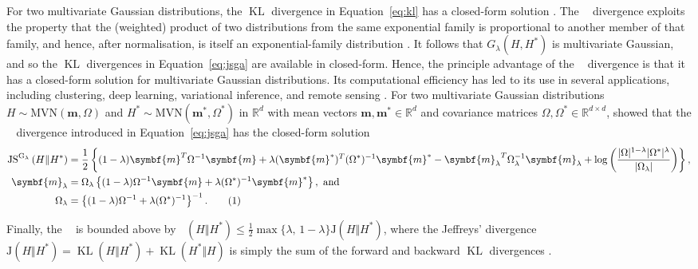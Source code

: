 \documentclass[12pt,compact]{article}
\DeclareMathOperator{\KL}{KL}
\DeclarePairedDelimiter\abs{\lvert}{\rvert}%
\newcommand{\JSGa}{\mathop{\mathrm{JS}^{\mathrm{G}_{\lambda}}}\nolimits}
\newcommand\numberthis{\addtocounter{equation}{1}\tag{\theequation}}
\begin{document}
For two multivariate Gaussian distributions, the $\KL{}$ divergence in Equation~\eqref{eq:kl} has a closed-form solution \citep{Duchi2007}.
The $\JSGa{}$ divergence exploits the property that the (weighted) product of two distributions from the same exponential family is proportional to another member of that family, and hence, after normalisation, is itself an exponential-family distribution \citep{Nielsen2019}.
It follows that $G_{\lambda}(H, H^*)$ is multivariate Gaussian, and so the $\KL{}$ divergences in Equation~\eqref{eq:jsga} are available in closed-form.
Hence, the principle advantage of the $\JSGa{}$ divergence is that it has a closed-form solution for multivariate Gaussian distributions.
Its computational efficiency \citep{Nielsen2019} has led to its use in several applications, including clustering, deep learning, variational inference, and remote sensing \citep{Nielsen2019, Deasy2020, Ni2023-cd, Thiagarajan2025}.
For two multivariate Gaussian distributions $H \sim \mbox{MVN}(\symbf{m}, \Omega)$ and $H^* \sim \mbox{MVN}(\symbf{m}^*, \Omega^*)$ in $\mathbb{R}^d$ with mean vectors $\symbf{m}, \symbf{m}^* \in \mathbb{R}^d$ and covariance matrices $\Omega, \Omega^* \in \mathbb{R}^{d \times d}$, \citet{Nielsen2019} showed that the $\JSGa{}$ divergence introduced in Equation~\eqref{eq:jsga} has the closed-form solution 
\begin{align*}
  \JSGa{}(H \Vert H^*) &= \frac{1}{2} \left\{ (1-\lambda) \symbf{m}^T \Omega^{-1} \symbf{m} + \lambda (\symbf{m}^*)^T (\Omega^*)^{-1} \symbf{m}^* - {\symbf{m}_{\lambda}}^T \Omega_{\lambda}^{-1} \symbf{m}_{\lambda} + \log{\left( \frac{\abs{\Omega}^{1-\lambda} \abs{\Omega^*}^{\lambda}}{\abs{\Omega_{\lambda}}} \right)} \right\}, \\
  \symbf{m}_{\lambda} &= \Omega_{\lambda} \left\{(1-\lambda) \Omega^{-1} \symbf{m} + \lambda (\Omega^*)^{-1} \symbf{m}^* \right\}, \text{ and} \\
  \Omega_{\lambda} &= \left\{ (1-\lambda) \Omega^{-1} + \lambda (\Omega^*)^{-1} \right\}^{-1}. \numberthis \label{eq:js_norm_mvn1}
\end{align*} 

Finally, the $\JSGa{}$ is bounded above by $\JSGa{(H \Vert H^*)} \leq \frac{1}{2}\max\{\lambda,\,1-\lambda\}\mathrm{J}(H \Vert H^*)$, 
where the Jeffreys' divergence $\mathrm{J}(H \Vert H^*) = \KL{(H \Vert H^*)} + \KL{(H^* \Vert H)}$ is simply the sum of the forward and backward $\KL{}$ divergences \citep{Nielsen2025}.
\end{document}
